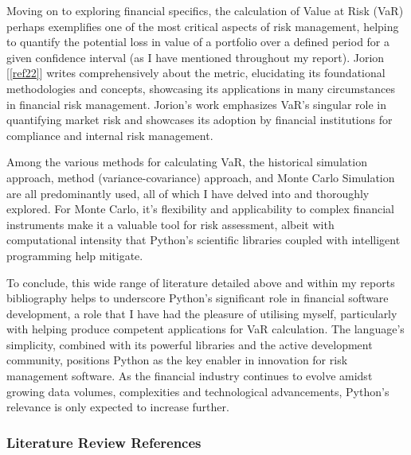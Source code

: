\documentclass{article}
\begin{document}
Moving on to exploring financial specifics, the calculation of Value at Risk (VaR) perhaps exemplifies one of the most critical aspects of risk management, helping to quantify the potential loss in value of a portfolio over a defined period for a given confidence interval (as I have mentioned throughout my report). Jorion [\ref{ref22}] writes comprehensively about the metric, elucidating its foundational methodologies and concepts, showcasing its applications in many circumstances in financial risk management. Jorion's work emphasizes VaR's singular role in quantifying market risk and showcases its adoption by financial institutions for compliance and internal risk management.\\\vspace{0.3cm}

Among the various methods for calculating VaR, the historical simulation approach, method (variance-covariance) approach, and Monte Carlo Simulation are all predominantly used, all of which I have delved into and thoroughly explored. For Monte Carlo, it's flexibility and applicability to complex financial instruments make it a valuable tool for risk assessment, albeit with computational intensity that Python's scientific libraries coupled with intelligent programming help mitigate.\\\vspace{0.3cm}

To conclude, this wide range of literature detailed above and within my reports bibliography helps to underscore Python's significant role in financial software development, a role that I have had the pleasure of utilising myself, particularly with helping produce competent applications for VaR calculation. The language's simplicity, combined with its powerful libraries and the active development community, positions Python as the key enabler in innovation for risk management software. As the financial industry continues to evolve amidst growing data volumes, complexities and technological advancements, Python's relevance is only expected to increase further.

\subsubsection{Literature Review References}
\end{document}
